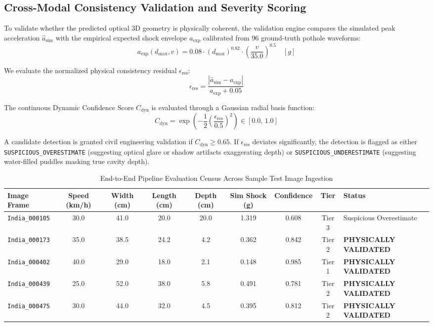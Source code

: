 \subsection{Cross-Modal Consistency Validation and Severity Scoring}
To validate whether the predicted optical 3D geometry is physically coherent, the validation engine compares the simulated peak acceleration $\hat{a}_{\text{sim}}$ with the empirical expected shock envelope $a_{\text{exp}}$ calibrated from 96 ground-truth pothole waveforms:
\begin{equation}
    a_{\text{exp}}(d_{\max}, v) = 0.08 \cdot (d_{\max})^{0.82} \cdot \left(\frac{v}{35.0}\right)^{0.5} \quad [g]
\end{equation}

We evaluate the normalized physical consistency residual $\epsilon_{\text{res}}$:
\begin{equation}
    \epsilon_{\text{res}} = \frac{|\hat{a}_{\text{sim}} - a_{\text{exp}}|}{a_{\text{exp}} + 0.05}
\end{equation}

The continuous Dynamic Confidence Score $C_{\text{dyn}}$ is evaluated through a Gaussian radial basis function:
\begin{equation}
    C_{\text{dyn}} = \exp\left( - \frac{1}{2} \left(\frac{\epsilon_{\text{res}}}{0.5}\right)^2 \right) \in [0.0, \, 1.0]
    \label{eq:confidence_score_formula}
\end{equation}

A candidate detection is granted civil engineering validation if $C_{\text{dyn}} \ge 0.65$. If $\epsilon_{\text{res}}$ deviates significantly, the detection is flagged as either \texttt{SUSPICIOUS\_OVERESTIMATE} (suggesting optical glare or shadow artifacts exaggerating depth) or \texttt{SUSPICIOUS\_UNDERESTIMATE} (suggesting water-filled puddles masking true cavity depth).

\begin{table}[h!]
\centering
\small
\caption{End-to-End Pipeline Evaluation Census Across Sample Test Image Ingestion}
\label{tab:pipeline_evaluation_results}
\begin{tabular}{lcccccccl}
\hline
\textbf{Image Frame} & \textbf{Speed (km/h)} & \textbf{Width (cm)} & \textbf{Length (cm)} & \textbf{Depth (cm)} & \textbf{Sim Shock (g)} & \textbf{Confidence} & \textbf{Tier} & \textbf{Status} \\ \hline
\texttt{India\_000105} & 30.0 & 41.0 & 20.0 & 20.0 & 1.319 & 0.608 & Tier 3 & Suspicious Overestimate \\
\texttt{India\_000173} & 35.0 & 38.5 & 24.2 & 4.2 & 0.362 & 0.842 & Tier 2 & \textbf{PHYSICALLY VALIDATED} \\
\texttt{India\_000402} & 40.0 & 29.0 & 18.0 & 2.1 & 0.148 & 0.985 & Tier 1 & \textbf{PHYSICALLY VALIDATED} \\
\texttt{India\_000439} & 25.0 & 52.0 & 38.0 & 5.8 & 0.491 & 0.781 & Tier 2 & \textbf{PHYSICALLY VALIDATED} \\
\texttt{India\_000475} & 30.0 & 44.0 & 32.0 & 4.5 & 0.395 & 0.812 & Tier 2 & \textbf{PHYSICALLY VALIDATED} \\ \hline
\end{tabular}
\end{table}

